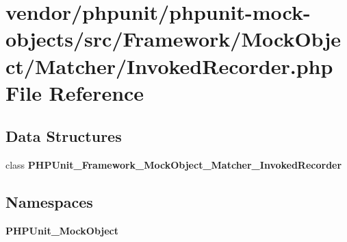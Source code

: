\section{vendor/phpunit/phpunit-\/mock-\/objects/src/\+Framework/\+Mock\+Object/\+Matcher/\+Invoked\+Recorder.php File Reference}
\label{_invoked_recorder_8php}
\subsection*{Data Structures}
\begin{DoxyCompactItemize}
\item 
class {\bf P\+H\+P\+Unit\+\_\+\+Framework\+\_\+\+Mock\+Object\+\_\+\+Matcher\+\_\+\+Invoked\+Recorder}
\end{DoxyCompactItemize}
\subsection*{Namespaces}
\begin{DoxyCompactItemize}
\item 
 {\bf P\+H\+P\+Unit\+\_\+\+Mock\+Object}
\end{DoxyCompactItemize}
